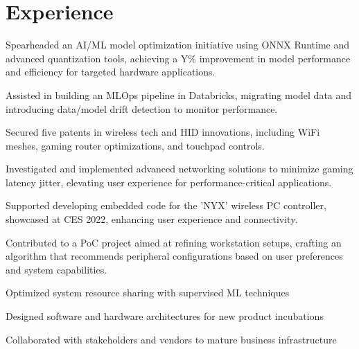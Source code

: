 \documentclass[]{resume-openfont}
\begin{document}
\vspace{-5 mm}

\begin{minipage}[t]{1\textwidth}
\section{Experience}
\titlerule
\vspace{2.5 mm}

\vspace{\topsep}
\begin{tightemize}
\item Spearheaded an AI/ML model optimization initiative using ONNX Runtime and advanced quantization tools, achieving a Y\% improvement in model performance and efficiency for targeted hardware applications.
\item Assisted in building an MLOps pipeline in Databricks, migrating model data and introducing data/model drift detection to monitor performance.
\item Secured five patents in wireless tech and HID innovations, including WiFi meshes, gaming router optimizations, and touchpad controls.
\item Investigated and implemented advanced networking solutions to minimize gaming latency jitter, elevating user experience for performance-critical applications.
\item Supported developing embedded code for the 'NYX' wireless PC controller, showcased at CES 2022, enhancing user experience and connectivity.
\item Contributed to a PoC project aimed at refining workstation setups, crafting an algorithm that recommends peripheral configurations based on user preferences and system capabilities.
\end{tightemize}
\sectionsep

\begin{tightemize}
\item Optimized system resource sharing with supervised ML techniques
\item Designed software and hardware architectures for new product incubations
\item Collaborated with stakeholders and vendors to mature business infrastructure
\end{tightemize}
\sectionsep


\end{minipage}
\end{document}
